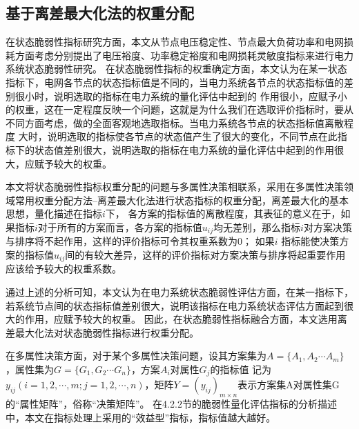 \subsection{基于离差最大化法的权重分配}
\label{sec:nomalz}
在状态脆弱性指标研究方面，本文从节点电压稳定性、节点最大负荷功率和电网损耗方面考虑分别提出了电压裕度、功率稳定裕度和电网损耗灵敏度指标来进行电力系统状态脆弱性研究。
在状态脆弱性指标的权重确定方面，本文认为在某一状态指标下，电网各节点的状态指标值是不同的，当电力系统各节点的状态指标值的差别很小时，说明选取的指标在电力系统的量化评估中起到的
作用很小，应赋予小的权重，这在一定程度反映一个问题，这就是为什么我们在选取评价指标时，要从不同方面考虑，做的全面客观地选取指标。当电力系统各节点的状态指标值离散程度
大时，说明选取的指标使各节点的状态值产生了很大的变化，不同节点在此指标下的状态值差别很大，说明选取的指标在电力系统的量化评估中起到的作用很大，应赋予较大的权重。

本文将状态脆弱性指标权重分配的问题与多属性决策相联系，采用在多属性决策领域常用权重分配方法--离差最大化法进行状态指标的权重分配，离差最大化的基本思想，量化描述在指标$i$下，
各方案的指标值的离散程度，其表征的意义在于，如果指标$i$对于所有的方案而言，各方案的指标值$u_{ij}$均无差别，那么指标$i$对方案决策与排序将不起作用，这样的评价指标可令其权重系数为0；
如果$i$ 指标能使决策方案的指标值$u_{ij}$间的有较大差异，这样的评价指标对方案决策与排序将起重要作用应该给予较大的权重系数\cite{refs77,refs78}。

通过上述的分析可知，本文认为在电力系统状态脆弱性评估方面，在某一指标下，若系统节点间的状态指标值差别很大，说明该指标在电力系统状态评估方面起到很大的作用，应赋予较大的权重。
因此，在状态脆弱性指标融合方面，本文选用离差最大化法对状态脆弱性指标进行权重分配。

在多属性决策方面，对于某个多属性决策问题，设其方案集为$A = \{A_1,A_2 \cdots A_m\}$，属性集为$G = \{G_1,G_2 \cdots G_n\}$，方案$A_i$对属性$G_j$的指标值
记为$y_{ij}\left(i = 1,2,\cdots,m;j = 1,2,\cdots,n\right)$，矩阵$Y = \left(y_{ij}\right)_{m \times n}$表示方案集A对属性集G的“属性矩阵”，俗称“决策矩阵”。
在4.2.2节的脆弱性量化评估指标的分析描述中，本文在指标处理上采用的“效益型”指标，指标值越大越好\cite{refs78}。

